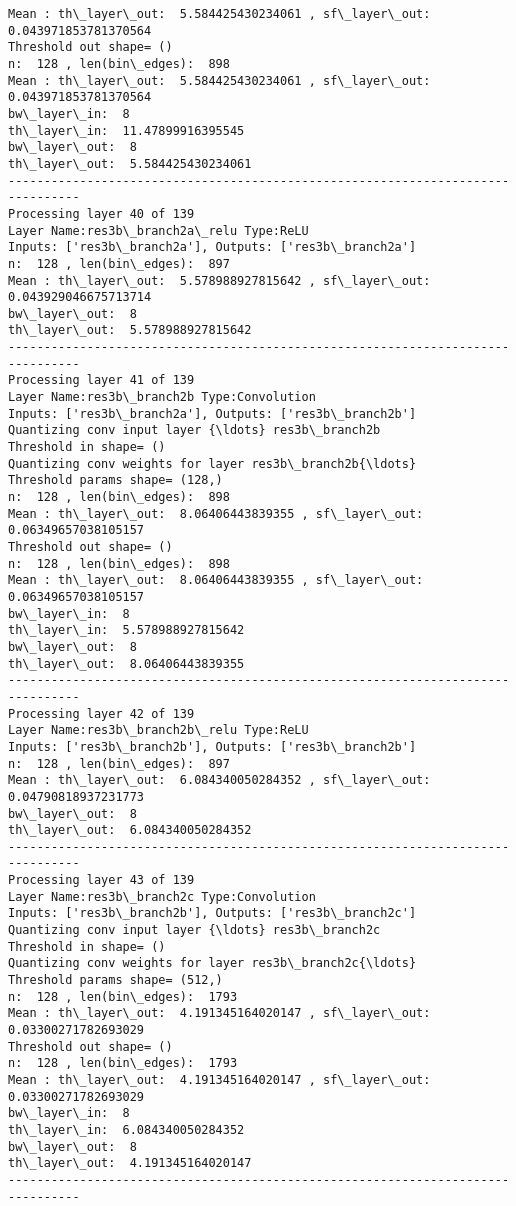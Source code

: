\documentclass[11pt]{article}
\begin{document}
\begin{Verbatim}[commandchars=\\\{\}]
Mean : th\_layer\_out:  5.584425430234061 , sf\_layer\_out:  0.043971853781370564
Threshold out shape= ()
n:  128 , len(bin\_edges):  898
Mean : th\_layer\_out:  5.584425430234061 , sf\_layer\_out:  0.043971853781370564
bw\_layer\_in:  8
th\_layer\_in:  11.47899916395545
bw\_layer\_out:  8
th\_layer\_out:  5.584425430234061
--------------------------------------------------------------------------------
Processing layer 40 of 139
Layer Name:res3b\_branch2a\_relu Type:ReLU
Inputs: ['res3b\_branch2a'], Outputs: ['res3b\_branch2a']
n:  128 , len(bin\_edges):  897
Mean : th\_layer\_out:  5.578988927815642 , sf\_layer\_out:  0.043929046675713714
bw\_layer\_out:  8
th\_layer\_out:  5.578988927815642
--------------------------------------------------------------------------------
Processing layer 41 of 139
Layer Name:res3b\_branch2b Type:Convolution
Inputs: ['res3b\_branch2a'], Outputs: ['res3b\_branch2b']
Quantizing conv input layer {\ldots} res3b\_branch2b
Threshold in shape= ()
Quantizing conv weights for layer res3b\_branch2b{\ldots}
Threshold params shape= (128,)
n:  128 , len(bin\_edges):  898
Mean : th\_layer\_out:  8.06406443839355 , sf\_layer\_out:  0.06349657038105157
Threshold out shape= ()
n:  128 , len(bin\_edges):  898
Mean : th\_layer\_out:  8.06406443839355 , sf\_layer\_out:  0.06349657038105157
bw\_layer\_in:  8
th\_layer\_in:  5.578988927815642
bw\_layer\_out:  8
th\_layer\_out:  8.06406443839355
--------------------------------------------------------------------------------
Processing layer 42 of 139
Layer Name:res3b\_branch2b\_relu Type:ReLU
Inputs: ['res3b\_branch2b'], Outputs: ['res3b\_branch2b']
n:  128 , len(bin\_edges):  897
Mean : th\_layer\_out:  6.084340050284352 , sf\_layer\_out:  0.04790818937231773
bw\_layer\_out:  8
th\_layer\_out:  6.084340050284352
--------------------------------------------------------------------------------
Processing layer 43 of 139
Layer Name:res3b\_branch2c Type:Convolution
Inputs: ['res3b\_branch2b'], Outputs: ['res3b\_branch2c']
Quantizing conv input layer {\ldots} res3b\_branch2c
Threshold in shape= ()
Quantizing conv weights for layer res3b\_branch2c{\ldots}
Threshold params shape= (512,)
n:  128 , len(bin\_edges):  1793
Mean : th\_layer\_out:  4.191345164020147 , sf\_layer\_out:  0.03300271782693029
Threshold out shape= ()
n:  128 , len(bin\_edges):  1793
Mean : th\_layer\_out:  4.191345164020147 , sf\_layer\_out:  0.03300271782693029
bw\_layer\_in:  8
th\_layer\_in:  6.084340050284352
bw\_layer\_out:  8
th\_layer\_out:  4.191345164020147
--------------------------------------------------------------------------------

\end{Verbatim}
\end{document}
